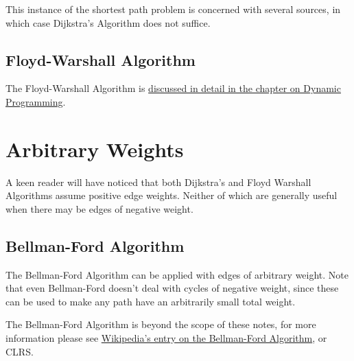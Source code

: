 This instance of the shortest path problem is concerned with several
sources, in which case Dijkstra's Algorithm does not suffice.

\subsection{Floyd-Warshall Algorithm}

The Floyd-Warshall Algorithm is
\hyperlink{sec:floyd_warshall}{discussed in detail in the chapter on
  Dynamic Programming}.

\section{Arbitrary Weights}

A keen reader will have noticed that both Dijkstra's and Floyd
Warshall Algorithms assume positive edge weights.  Neither of which
are generally useful when there may be edges of negative weight.

\subsection{Bellman-Ford Algorithm}

The Bellman-Ford Algorithm can be applied with edges of arbitrary
weight.  Note that even Bellman-Ford doesn't deal with cycles of
negative weight, since these can be used to make any path have an
arbitrarily small total weight.

The Bellman-Ford Algorithm is beyond the scope of these notes, for
more information please see
\href{https://en.wikipedia.org/wiki/Bellman-Ford}{Wikipedia's entry on
  the Bellman-Ford Algorithm}, or CLRS.
